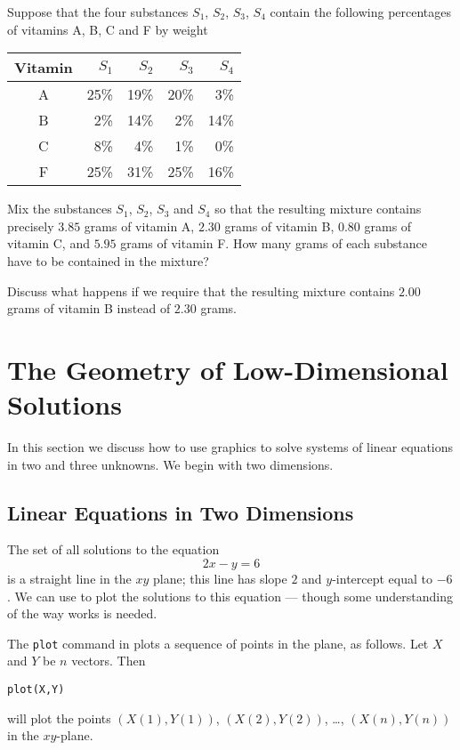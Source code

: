 \begin{exercise} \label{c2.1.7}
Suppose that the four substances $S_1$, $S_2$, $S_3$, $S_4$
contain the following percentages of vitamins A, B, C and F by
weight
\begin{center}
\begin{tabular}{|c||r|r|r|r|}
\hline
Vitamin   & $S_1$ & $S_2$ & $S_3$ & $S_4$\\
\hline
 A & 25\% &    19\% &    20\% &    3\% \\
 B &  2\% &    14\% &     2\% &   14\% \\
 C &  8\% &     4\% &     1\% &     0\% \\
 F & 25\% &    31\% &    25\% &    16\% \\
\hline
\end{tabular}
\end{center}
Mix the substances $S_1$, $S_2$, $S_3$ and $S_4$ so that the
resulting mixture contains precisely $3.85$ grams of vitamin A,
$2.30$ grams of vitamin B, $0.80$ grams of vitamin C, and $5.95$
grams of vitamin F.  How many grams of each substance have to be
contained in the mixture?

Discuss what happens if we require that the resulting mixture contains
$2.00$ grams of vitamin B instead of $2.30$ grams.
\end{exercise}



\section{The Geometry of Low-Dimensional Solutions}
\label{S:2.2}

In this section we discuss how to use \Matlab graphics to solve
systems of linear equations in two and three unknowns.  We begin
with two dimensions.

\subsection*{Linear Equations in Two Dimensions}

The set of all solutions to the equation
\begin{equation} \label{2x-y=6}
2x - y = 6
\end{equation}
is a straight line in the $xy$ plane; this line
has slope $2$ and $y$-intercept equal to $-6$.  We can use
\Matlab to plot the solutions to this equation --- though some
understanding of the way \Matlab works is needed.

The {\tt plot} command in \Matlab plots a sequence of points in
the plane, as follows.  Let $X$ and $Y$ be $n$ vectors. Then
\begin{verbatim}
plot(X,Y)
\end{verbatim} 
will plot the points $(X(1),Y(1))$, $(X(2),Y(2))$, \ldots,
$(X(n),Y(n))$ in the $xy$-plane.  

